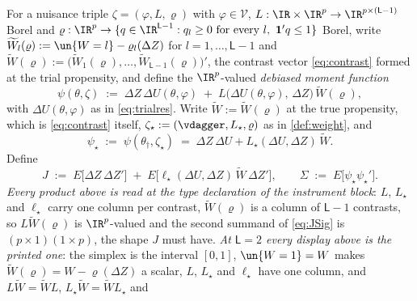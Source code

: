 
\begin{definition}\label{def:moment}
For a nuisance triple $\zeta=(\varphi,L,\varrho)$ with $\varphi\in\mathcal V$,
$L:\IR\times\IR^{p}\to\IR^{p\times(\mathsf L-1)}$ Borel and
$\varrho:\IR^{p}\to\{q\in\IR^{\mathsf L-1}:q_l\ge0\ \text{for every }l,\ \mathbf 1'q\le1\}$ Borel, write
$\widetilde W_l(\varrho):=\un\{W=l\}-\varrho_l(\Delta Z)$ for $l=1,\dots,\mathsf L-1$ and
$\widetilde W(\varrho):=\big(\widetilde W_1(\varrho),\dots,\widetilde W_{\mathsf L-1}(\varrho)\big)'$, the
contrast vector \eqref{eq:contrast} formed at the trial propensity, and define the
$\IR^{p}$-valued \emph{debiased moment function}
\begin{equation}\label{eq:psidef}
\psi(\theta,\zeta)\;:=\;\Delta Z\,\Delta U(\theta,\varphi)\;+\;
L\big(\Delta U(\theta,\varphi),\,\Delta Z\big)\,\widetilde W(\varrho),
\end{equation}
with $\Delta U(\theta,\varphi)$ as in \eqref{eq:trialres}. Write $\widetilde W:=\widetilde W(\varrho)$ at the
true propensity, which is \eqref{eq:contrast} itself,
$\zeta_\star:=(\vdagger,L_\star,\varrho)$ as in \cref{def:weight}, and
\begin{equation}\label{eq:psistar}
\psi_\star\;:=\;\psi(\theta_\dagger,\zeta_\star)\;=\;\Delta Z\,\Delta U+L_\star(\Delta U,\Delta Z)\,\widetilde W.
\end{equation}
Define
\begin{equation}\label{eq:JSig}
J\;:=\;E\big[\Delta Z\,\Delta Z'\big]\;+\;E\big[\ell_\star(\Delta U,\Delta Z)\,\widetilde W\,\Delta Z'\big],
\qquad
\Sigma\;:=\;E\big[\psi_\star\psi_\star'\big] .
\end{equation}
\emph{Every product above is read at the type declaration of the instrument block}: $L$, $L_\star$ and
$\ell_\star$ carry one column per contrast, $\widetilde W(\varrho)$ is a column of $\mathsf L-1$ contrasts,
so $L\widetilde W(\varrho)$ is $\IR^{p}$-valued and the second summand of \eqref{eq:JSig} is
$(p\times1)(1\times p)$, the shape $J$ must have. \emph{At $\mathsf L=2$ every display above is the printed
one}: the simplex is the interval $[0,1]$, $\un\{W=1\}=W$ makes
$\widetilde W(\varrho)=W-\varrho(\Delta Z)$ a scalar, $L$, $L_\star$ and $\ell_\star$ have one column, and
$L\widetilde W=\widetilde WL$, $L_\star\widetilde W=\widetilde WL_\star$ and

\end{definition}
